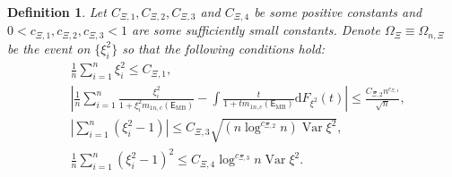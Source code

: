 \documentclass[10pt,a4paper]{amsart}
\newtheorem{definition}{Definition}
\begin{document}
\begin{definition}\label{def_OmegaM}
	Let $C_{\Xi,1}, C_{\Xi,2}, C_{\Xi,3}$ and $C_{\Xi,4}$  be some positive constants and $0<c_{\Xi,1},c_{\Xi,2}, c_{\Xi,3}<1$ are some sufficiently small constants. Denote $\Omega_\Xi\equiv\Omega_{n,\Xi}$ be the event on $\{\xi^2_i\}$ so that the following conditions hold:
	\begin{align*}
		&\frac{1}{n}\sum_{i=1}^n\xi^2_i\leq C_{\Xi,1},\\
		&\left|\frac{1}{n}\sum_{i=1}^n\frac{\xi^2_i}{1+\xi^2_im_{1n,c}(\mathsf{E}_{\mathrm{MB}})}-\int\frac{t}{1+tm_{1n,c}(\mathsf{E}_{\mathrm{MB}})}\mathrm{d}F_{\xi^2}(t)\right|\leq \frac{C_{\Xi,2}n^{c_{\Xi,1}}}{\sqrt{n}},\\
		&\left|\sum_{i=1}^n(\xi^2_i-1)\right|\leq C_{\Xi,3}\sqrt{(n\log^{c_{\Xi,2}}n)\operatorname{Var}\xi^2},\\
		&\frac{1}{n}\sum_{i=1}^n(\xi^2_i-1)^2\leq C_{\Xi,4}\log^{c_{\Xi,3}}n\operatorname{Var}\xi^2.
	\end{align*}
\end{definition}
\end{document}
